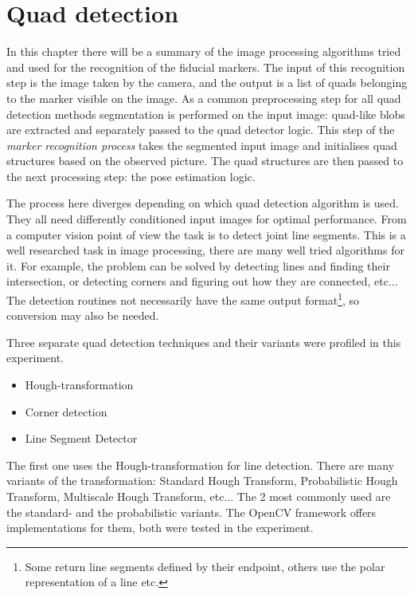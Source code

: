 \chapter{Quad detection}\label{sect:quad_detection}

In this chapter there will be a summary of the image processing algorithms tried and used for the recognition of the fiducial markers.
The input of this recognition step is the image taken by the camera, and the output is a list of quads belonging to the marker visible on the image.
As a common preprocessing step for all quad detection methods segmentation is performed on the input image: quad-like blobs are extracted and separately passed to the quad detector logic.
This step of the \textit{marker recognition process} takes the segmented input image and initialises quad structures based on the observed picture.
The quad structures are then passed to the next processing step: the pose estimation logic.

The process here diverges depending on which quad detection algorithm is used.
They all need differently conditioned input images for optimal performance.
From a computer vision point of view the task is to detect joint line segments.
This is a well researched task in image processing, there are many well tried algorithms for it.
For example, the problem can be solved by detecting lines and finding their intersection, or detecting corners and figuring out how they are connected, etc...
The detection routines not necessarily have the same output format\footnote{Some return line segments defined by their endpoint, others use the polar representation of a line etc.}, so conversion may also be needed.

Three separate quad detection techniques and their variants were profiled in this experiment.
\begin{itemize}
	\item Hough-transformation
	\item Corner detection
	\item Line Segment Detector\cite{LSDDet}
\end{itemize}
The first one uses the Hough-transformation for line detection.
There are many variants of the transformation: Standard Hough Transform, Probabilistic Hough Transform, Multiscale Hough Transform, etc...
The 2 most commonly used are the standard- and the probabilistic variants.
The OpenCV framework offers implementations for them, both were tested in the experiment.

